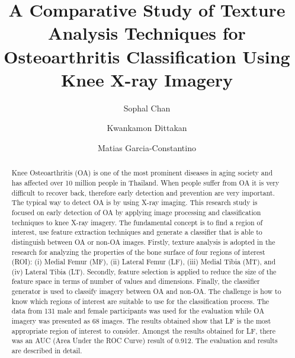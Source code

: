 \documentclass[review]{elsarticle}
\begin{document}
\begin{frontmatter}

\title{A Comparative Study of Texture Analysis Techniques for Osteoarthritis Classification Using Knee X-ray Imagery}


\author[mymainaddress]{Sophal Chan}
\author[mymainaddress]{Kwankamon Dittakan}
\author[mysecondaryaddress]{Matias Garcia-Constantino}



\address[mymainaddress]{College of Computing, Prince of Songkla University, 80, Moo 1, Vichitsongkram Rd, Kathu, Kathu, Phuket, Thailand 83120}
\address[mysecondaryaddress]{School of Computing, Ulster University, Shore Road, Newtownabbey, County Antrim, BT37 0QB, United Kingdom}

\begin{abstract}
Knee Osteoarthritis (OA) is one of the most prominent diseases in aging society and has affected over 10 million people in Thailand. When people suffer from OA it is very difficult to recover back, therefore early detection and prevention are very important. The typical way to detect OA is by using X-ray imaging. This research study is focused on early detection of OA by applying image processing and classification techniques to knee X-ray imagery. The fundamental concept is to find a region of interest, use feature extraction techniques and generate a classifier that is able to distinguish between OA or non-OA images. Firstly, texture analysis is adopted in the research for analyzing the properties of the bone surface of four regions of interest (ROI): (i) Medial Femur (MF), (ii) Lateral Femur (LF), (iii) Medial Tibia (MT), and (iv) Lateral Tibia (LT). Secondly, feature selection is applied to reduce the size of the feature space in terms of number of values and dimensions. Finally, the classifier generator is used to classify imagery between OA and non-OA. The challenge is how to know which regions of interest are suitable to use for the classification process. The data from 131 male and female participants was used for the evaluation while OA imagery was presented as 68 images. The results obtained show that LF is the most appropriate region of interest to consider. Amongst the results obtained for LF, there was an AUC (Area Under the ROC Curve) result of 0.912. The evaluation and results are described in detail.
\end{abstract}


\end{frontmatter}
\end{document}
